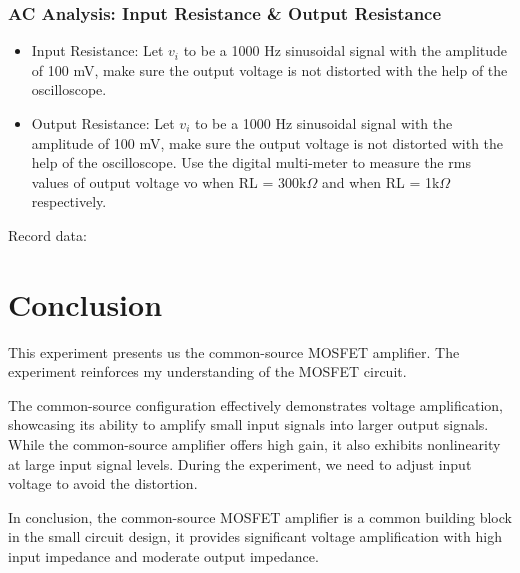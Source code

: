     \subsubsection{AC Analysis: Input Resistance \& Output Resistance}
    \begin{itemize}
        \item Input Resistance: Let $v_i$ to be a 1000 Hz sinusoidal signal with the amplitude of 100 mV, make sure the output voltage is not distorted with the help of the oscilloscope.
        \item Output Resistance: Let $v_i$ to be a 1000 Hz sinusoidal signal with the amplitude of 100 mV, make sure the output voltage is not distorted with the help of the oscilloscope. Use the digital multi-meter to measure the rms values of output voltage vo when RL = 300k$\Omega$ and when RL = 1k$\Omega$ respectively.
    \end{itemize}
    Record data:\\
\begin{table}[h]
\centering
{}
\end{table}
\FloatBarrier

    

\section{Conclusion}
This experiment presents us the common-source MOSFET amplifier. The experiment reinforces my understanding of the MOSFET circuit.\par
The common-source configuration effectively demonstrates voltage amplification, showcasing its ability to amplify small input signals into larger output signals. While the common-source amplifier offers high gain, it also exhibits nonlinearity at large input signal levels. During the experiment, we need to adjust input voltage to avoid the distortion.\par
In conclusion, the common-source MOSFET amplifier is a common building block in the small circuit design, it provides significant voltage amplification with high input impedance and moderate output impedance.